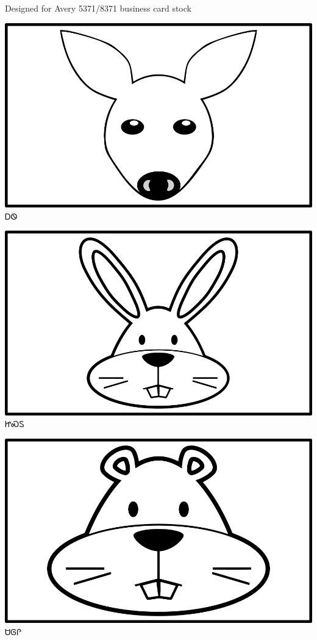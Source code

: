 \documentclass[avery5371]{flashcards}%
\begin{document}
Designed for Avery 5371/8371 business card stock

\begin{flashcard}{
\includegraphics[width=0.95\columnwidth,height=.51\columnwidth,keepaspectratio]{../artwork/objects-animate/ahwi}
}\Huge ᎠᏫ
\end{flashcard}

\begin{flashcard}{
\includegraphics[width=0.95\columnwidth,height=.51\columnwidth,keepaspectratio]{../artwork/objects-animate/jisdu}
}\Huge ᏥᏍᏚ
\end{flashcard}

\begin{flashcard}{
\includegraphics[width=0.95\columnwidth,height=.51\columnwidth,keepaspectratio]{../artwork/objects-animate/saloli}
}\Huge ᏌᎶᎵ
\end{flashcard}
\end{document}
